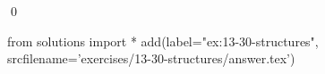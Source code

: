 
\begin{ex}
  \label{ex:13-30-structures}
  
  \qed
\end{ex}
\begin{python0}
from solutions import *
add(label="ex:13-30-structures",
    srcfilename='exercises/13-30-structures/answer.tex')
\end{python0}
